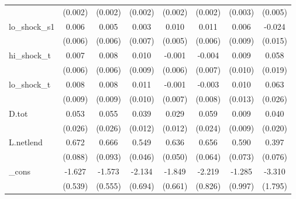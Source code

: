 {\begin{tabular}{l*{7}{c}}
            &     (0.002)         &     (0.002)         &     (0.002)         &     (0.002)         &     (0.002)         &     (0.003)         &     (0.005)         \\
\addlinespace
lo\_shock\_s1 &       0.006         &       0.005         &       0.003         &       0.010\sym{**} &       0.011\sym{*}  &       0.006         &      -0.024         \\
            &     (0.006)         &     (0.006)         &     (0.007)         &     (0.005)         &     (0.006)         &     (0.009)         &     (0.015)         \\
\addlinespace
hi\_shock\_t  &       0.007         &       0.008         &       0.010         &      -0.001         &      -0.004         &       0.009         &       0.058\sym{***}\\
            &     (0.006)         &     (0.006)         &     (0.009)         &     (0.006)         &     (0.007)         &     (0.010)         &     (0.019)         \\
\addlinespace
lo\_shock\_t  &       0.008         &       0.008         &       0.011         &      -0.001         &      -0.003         &       0.010         &       0.063\sym{**} \\
            &     (0.009)         &     (0.009)         &     (0.010)         &     (0.007)         &     (0.008)         &     (0.013)         &     (0.026)         \\
\addlinespace
D.tot       &       0.053\sym{*}  &       0.055\sym{**} &       0.039\sym{***}&       0.029\sym{**} &       0.059\sym{**} &       0.009         &       0.040\sym{*}  \\
            &     (0.026)         &     (0.026)         &     (0.012)         &     (0.012)         &     (0.024)         &     (0.009)         &     (0.020)         \\
\addlinespace
L.netlend   &       0.672\sym{***}&       0.666\sym{***}&       0.549\sym{***}&       0.636\sym{***}&       0.656\sym{***}&       0.590\sym{***}&       0.397\sym{***}\\
            &     (0.088)         &     (0.093)         &     (0.046)         &     (0.050)         &     (0.064)         &     (0.073)         &     (0.076)         \\
\addlinespace
\_cons      &      -1.627\sym{***}&      -1.573\sym{***}&      -2.134\sym{***}&      -1.849\sym{***}&      -2.219\sym{**} &      -1.285         &      -3.310\sym{*}  \\
            &     (0.539)         &     (0.555)         &     (0.694)         &     (0.661)         &     (0.826)         &     (0.997)         &     (1.795)         \\

\end{tabular}}
